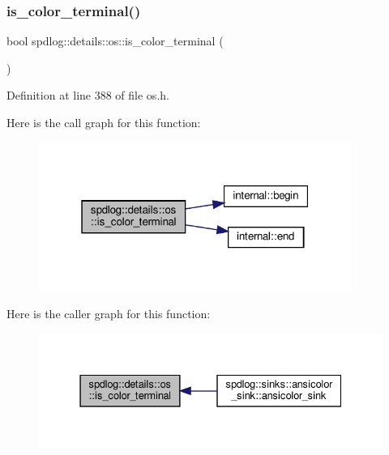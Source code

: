 \subsubsection{\texorpdfstring{is\+\_\+color\+\_\+terminal()}{is\_color\_terminal()}}
{\footnotesize\ttfamily bool spdlog\+::details\+::os\+::is\+\_\+color\+\_\+terminal (\begin{DoxyParamCaption}{ }\end{DoxyParamCaption})\hspace{0.3cm}{\ttfamily [inline]}}



Definition at line 388 of file os.\+h.

Here is the call graph for this function\+:
\nopagebreak
\begin{figure}[H]
\begin{center}
\leavevmode
\includegraphics[width=289pt]{namespacespdlog_1_1details_1_1os_a41c3f67d2cbabfcb20e89d0524e5097f_cgraph}
\end{center}
\end{figure}
Here is the caller graph for this function\+:
\nopagebreak
\begin{figure}[H]
\begin{center}
\leavevmode
\includegraphics[width=331pt]{namespacespdlog_1_1details_1_1os_a41c3f67d2cbabfcb20e89d0524e5097f_icgraph}
\end{center}
\end{figure}
\mbox{\label{namespacespdlog_1_1details_1_1os_aef63b92ee93ec66603c0357d0ac75bed}} 
